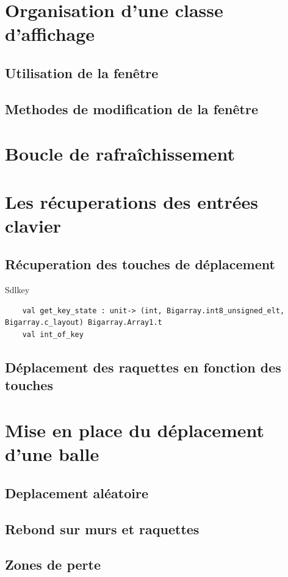 \documentclass[a4paper]{article}
\begin{document}
\section{Organisation d'une classe d'affichage}
\subsection{Utilisation de la fenêtre}
\subsection{Methodes de modification de la fenêtre}

\section{Boucle de rafraîchissement}

\section{Les récuperations des entrées clavier}
	\subsection{Récuperation des touches de déplacement}
	Sdlkey
	\begin{verbatim}
	val get_key_state : unit-> (int, Bigarray.int8_unsigned_elt, Bigarray.c_layout) Bigarray.Array1.t
	val int_of_key
	\end{verbatim}

	\subsection{Déplacement des raquettes en fonction des touches}

\section{Mise en place du déplacement d'une balle}
	\subsection{Deplacement aléatoire}
	\subsection{Rebond sur murs et raquettes}
	\subsection{Zones de perte}
\end{document}
